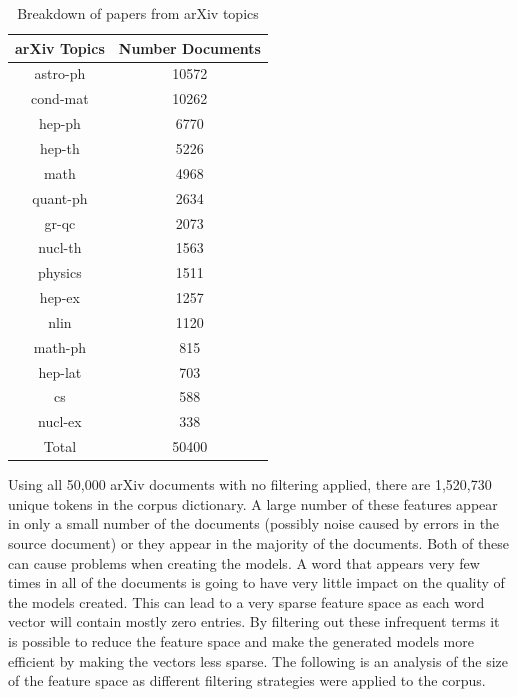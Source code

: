 \begin{table}[h]
    \centering
    \begin{tabular}{|c c|}
         \hline
         arXiv Topics & Number Documents \\ [0.5ex]
         \hline\hline
         astro-ph & 10572 \\
         cond-mat & 10262 \\
         hep-ph & 6770 \\
         hep-th & 5226 \\
         math & 4968 \\
         quant-ph & 2634 \\
         gr-qc & 2073 \\
         nucl-th & 1563 \\
         physics & 1511 \\
         hep-ex & 1257 \\
         nlin & 1120 \\
         math-ph & 815 \\
         hep-lat & 703 \\
         cs & 588 \\
         nucl-ex & 338 \\ [0.5ex]
         \hline\hline
         Total & 50400\\ [1ex]
         \hline
    \end{tabular}
    \caption{Breakdown of papers from arXiv topics}
    \label{table:arxivBreakdown}
\end{table}

Using all 50,000 arXiv documents with no filtering applied, there are 1,520,730 unique tokens in the corpus dictionary.
A large number of these features appear in only a small number of the documents (possibly noise caused by errors in the source document) or they appear in the majority of the documents.
Both of these can cause problems when creating the models.
A word that appears very few times in all of the documents is going to have very little impact on the quality of the models created.
This can lead to a very sparse feature space as each word vector will contain mostly zero entries.
By filtering out these infrequent terms it is possible to reduce the feature space and make the generated models more efficient by making the vectors less sparse. The following is an analysis of the size of the feature space as different filtering strategies were applied to the corpus.

